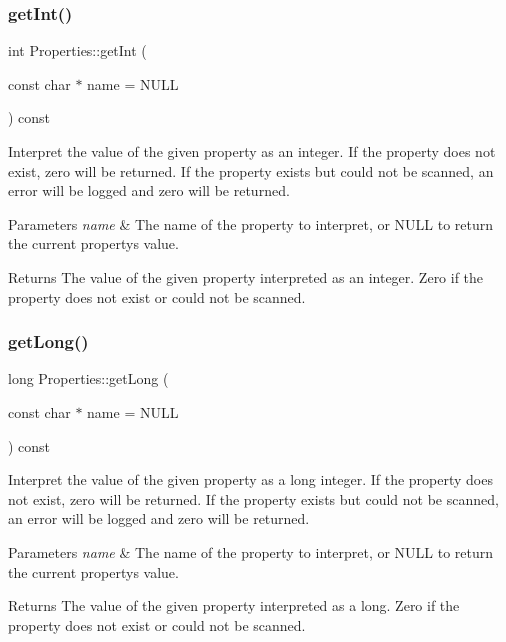 \subsubsection{\texorpdfstring{get\+Int()}{getInt()}\hspace{0.1cm}{\footnotesize\ttfamily [2/2]}}
{\footnotesize\ttfamily int Properties\+::get\+Int (\begin{DoxyParamCaption}\item[{const char $\ast$}]{name = {\ttfamily NULL} }\end{DoxyParamCaption}) const}

Interpret the value of the given property as an integer. If the property does not exist, zero will be returned. If the property exists but could not be scanned, an error will be logged and zero will be returned.


\begin{DoxyParams}{Parameters}
{\em name} & The name of the property to interpret, or N\+U\+LL to return the current property\textquotesingle{}s value.\\
\hline
\end{DoxyParams}
\begin{DoxyReturn}{Returns}
The value of the given property interpreted as an integer. Zero if the property does not exist or could not be scanned. 
\end{DoxyReturn}
\mbox{\label{classProperties_af288a30f0ad39ebf37a8415f0716ddd7}} 
\subsubsection{\texorpdfstring{get\+Long()}{getLong()}\hspace{0.1cm}{\footnotesize\ttfamily [1/2]}}
{\footnotesize\ttfamily long Properties\+::get\+Long (\begin{DoxyParamCaption}\item[{const char $\ast$}]{name = {\ttfamily NULL} }\end{DoxyParamCaption}) const}

Interpret the value of the given property as a long integer. If the property does not exist, zero will be returned. If the property exists but could not be scanned, an error will be logged and zero will be returned.


\begin{DoxyParams}{Parameters}
{\em name} & The name of the property to interpret, or N\+U\+LL to return the current property\textquotesingle{}s value.\\
\hline
\end{DoxyParams}
\begin{DoxyReturn}{Returns}
The value of the given property interpreted as a long. Zero if the property does not exist or could not be scanned. 
\end{DoxyReturn}
\mbox{\label{classProperties_af288a30f0ad39ebf37a8415f0716ddd7}} 
